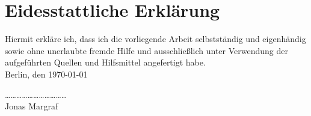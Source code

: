 
\section*{Eidesstattliche Erklärung}
\vspace{1cm}
Hiermit erkläre ich, dass ich die vorliegende Arbeit selbstständig und
eigenhändig sowie ohne unerlaubte fremde Hilfe und ausschließlich unter
Verwendung der aufgeführten Quellen und Hilfsmittel angefertigt habe.\\
Berlin, den \today\par
\vspace{2cm}
\noindent\ldots\ldots\ldots\ldots\ldots\ldots\ldots\ldots\ldots\ldots\ldots\\
Jonas Margraf
\newpage
